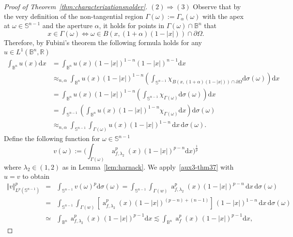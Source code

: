 \documentclass[11pt,a4paper,reqno]{amsart}
\theoremstyle{definition}
\renewcommand{\a}{\operatorname{a}}
\newcommand{\Om}{\Omega}
\newcommand{\om}{\omega}
\newcommand{\B}{\mathbb{B}^n}
\newcommand{\R}{\mathbb{R}}
\newcommand{\ud}{\mathrm {d}}
\newcommand{\Sn}{\mathbb{S}^{n-1}}
\numberwithin{komcounter}{section}
\begin{document}
\begin{proof}[Proof of Theorem~\ref{thm:characterizationsnolder}]
\noindent $(2)\Rightarrow (3)$ 	Observe that by the very definition of the non-tangential region $\Gamma(\om):=\Gamma_{\alpha}(\om)$ with the apex at $\om\in \Sn$ and the aperture $\alpha$, it holds for points in $\Gamma(\om)\cap \B$ that
\[
 x\in \Gamma(\om) \Leftrightarrow \om\in B(x, (1+\alpha)(1-|x|))\cap \partial \Om.
\]
Therefore, by Fubini's theorem the following formula holds for any $u\in L^1(\B,\R)$
\begin{align}
\int_{\B}u(x)\ud x &= \int_{\B}u(x) (1-|x|)^{1-n} (1-|x|)^{n-1}\ud x \nonumber \\
& \approx_{n, \alpha} \int_{\B}u(x) (1-|x|)^{1-n} \left(\int_{\Sn}\chi_{B(x, (1+\alpha)(1-|x|))\cap \partial \Om} \ud \sigma(\om) \right)\ud x \nonumber \\
& = \int_{\B}u(x) (1-|x|)^{1-n} \left(\int_{\Sn}\chi_{\Gamma(\om)} \ud \sigma(\om) \right)\ud x\nonumber \\
& = \int_{\Sn} \left(\int_{\B} u(x) (1-|x|)^{1-n} \chi_{\Gamma(\om)}\ud x \right)\ud \sigma(\om)\nonumber \\
&\approx_{n,\alpha} \int_{\Sn}\int_{\Gamma (\omega )}u(x)(1-|x|)^{1-n}\, \ud x\,\ud\sigma (\omega). \label{aux3-thm37}
\end{align}
Define the following function for $\om\in \Sn$ 
\begin{equation}
v(\om):=\Big(\int_{\Gamma (\om)}\a_{f,\lambda_2}^p(x)(1-|x|)^{p-n} \ud x\Big)^{\frac1p} \label{aux4-thm37}
\end{equation}
where $\lambda_2\in (1,2)$ as in Lemma~\ref{lem:harnack}.
We apply~\eqref{aux3-thm37} with $u=v$ to obtain  
\begin{eqnarray*}
\Vert v\Vert_{L^p(\Sn)}^p&=&\int_{\Sn}v(\omega )^p \ud\sigma (\omega )=\int_{\Sn}\int_{\Gamma (w)} \a_{f,\lambda_2}^p(x)(1-|x|)^{p-n} \, \ud x\, \ud\sigma (\omega ) \nonumber \\
&=& \int_{\Sn}\int_{\Gamma (w)}\left[\a_{f, \lambda_2}^p(x)(1-|x|)^{(p-n)+(n-1)}\right]\, (1-|x|)^{1-n} \, \ud x\, \ud\sigma (\omega ) \nonumber\\
&\simeq &\int_{\B}\a^p_{f,\lambda_2}(x)\, (1-|x|)^{p-1}\ud x  \lesssim \int_{\B}\a^p_{f}(x)\, (1-|x|)^{p-1}\ud x, %

\end{eqnarray*}
\end{proof}
\end{document}
